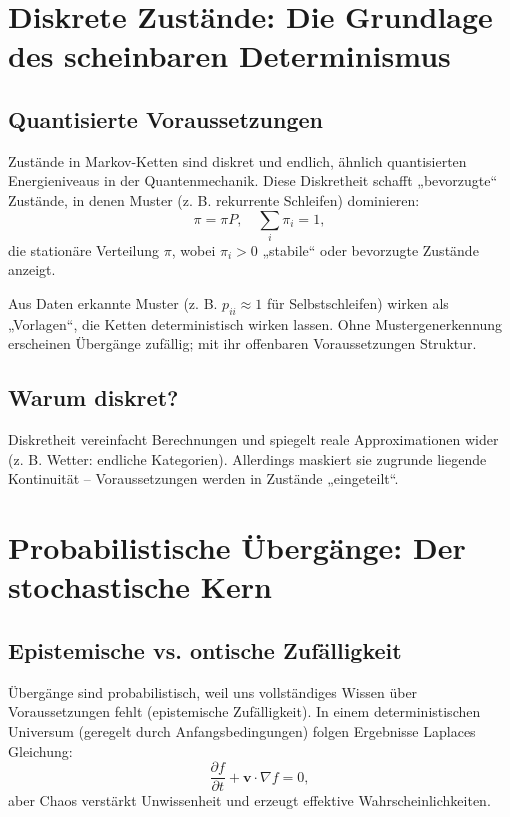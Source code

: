 \documentclass[12pt,a4paper]{article}
\begin{document}
	\section{Diskrete Zustände: Die Grundlage des scheinbaren Determinismus}
	\label{sec:discrete}
	
	\subsection{Quantisierte Voraussetzungen}
	Zustände in Markov-Ketten sind diskret und endlich, ähnlich quantisierten Energieniveaus in der Quantenmechanik. Diese Diskretheit schafft „bevorzugte“ Zustände, in denen Muster (z. B. rekurrente Schleifen) dominieren:
	\begin{equation}
		\pi = \pi P, \quad \sum_i \pi_i = 1,
	\end{equation}
	die stationäre Verteilung $\pi$, wobei $\pi_i > 0$ „stabile“ oder bevorzugte Zustände anzeigt.
	
	Aus Daten erkannte Muster (z. B. $p_{ii} \approx 1$ für Selbstschleifen) wirken als „Vorlagen“, die Ketten deterministisch wirken lassen. Ohne Mustergenerkennung erscheinen Übergänge zufällig; mit ihr offenbaren Voraussetzungen Struktur.
	
	\subsection{Warum diskret?}
	Diskretheit vereinfacht Berechnungen und spiegelt reale Approximationen wider (z. B. Wetter: endliche Kategorien). Allerdings maskiert sie zugrunde liegende Kontinuität – Voraussetzungen werden in Zustände „eingeteilt“.
	
	\section{Probabilistische Übergänge: Der stochastische Kern}
	\label{sec:probabilistic}
	
	\subsection{Epistemische vs. ontische Zufälligkeit}
	Übergänge sind probabilistisch, weil uns vollständiges Wissen über Voraussetzungen fehlt (epistemische Zufälligkeit). In einem deterministischen Universum (geregelt durch Anfangsbedingungen) folgen Ergebnisse Laplaces Gleichung:
	\begin{equation}
		\frac{\partial f}{\partial t} + \mathbf{v} \cdot \nabla f = 0,
	\end{equation}
	aber Chaos verstärkt Unwissenheit und erzeugt effektive Wahrscheinlichkeiten.
	
\end{document}
